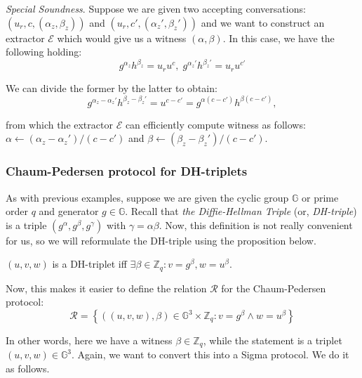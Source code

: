 \documentclass[../lecture-notes.tex]{subfiles}
\begin{document}
\textit{Special Soundness}. Suppose we are given two accepting conversations: $(u_r,c,(\alpha_z,\beta_z))$ and $(u_r,c',(\alpha_z',\beta_z'))$ and we want to construct an extractor $\mathcal{E}$ which would give us a witness $(\alpha,\beta)$. In this case, we have the following holding:
\begin{equation*}
    g^{\alpha_z}h^{\beta_z} = u_r u^c, \; g^{\alpha_z'}h^{\beta_z'} = u_r u^{c'}
\end{equation*}

We can divide the former by the latter to obtain:
\begin{equation*}
    g^{\alpha_z - \alpha_z'}h^{\beta_z - \beta_z'} = u^{c-c'} = g^{\alpha(c-c')}h^{\beta(c-c')},
\end{equation*}

from which the extractor $\mathcal{E}$ can efficiently compute witness as follows: $\alpha \gets (\alpha_z - \alpha_z')\big/(c-c')$ and $\beta \gets (\beta_z - \beta_z')\big/(c-c')$.

\subsubsection{Chaum-Pedersen protocol for DH-triplets}

As with previous examples, suppose we are given the cyclic group $\mathbb{G}$ or prime order $q$ and generator $g \in \mathbb{G}$. Recall that \textit{the Diffie-Hellman Triple} (or, \textit{DH-triple}) is a triple $(g^{\alpha},g^{\beta},g^{\gamma})$ with $\gamma=\alpha\beta$. Now, this definition is not really convenient for us, so we will reformulate the DH-triple using the proposition below.

\begin{proposition}
    $(u,v,w)$ is a DH-triplet iff $\exists \beta \in \mathbb{Z}_q: v = g^{\beta}, w = u^{\beta}$.
\end{proposition}

Now, this makes it easier to define the relation $\mathcal{R}$ for the Chaum-Pedersen protocol:
\vspace{-2mm}
\begin{equation*}
    \mathcal{R} = \left\{ ((u,v,w), \beta) \in \mathbb{G}^3 \times \mathbb{Z}_q: v = g^{\beta} \wedge w = u^{\beta} \right\}
\end{equation*}
\vspace{-4mm}

In other words, here we have a witness $\beta \in \mathbb{Z}_q$, while the statement is a triplet $(u,v,w) \in \mathbb{G}^3$. Again, we want to convert this into a Sigma protocol. We do it as follows.
\end{document}
